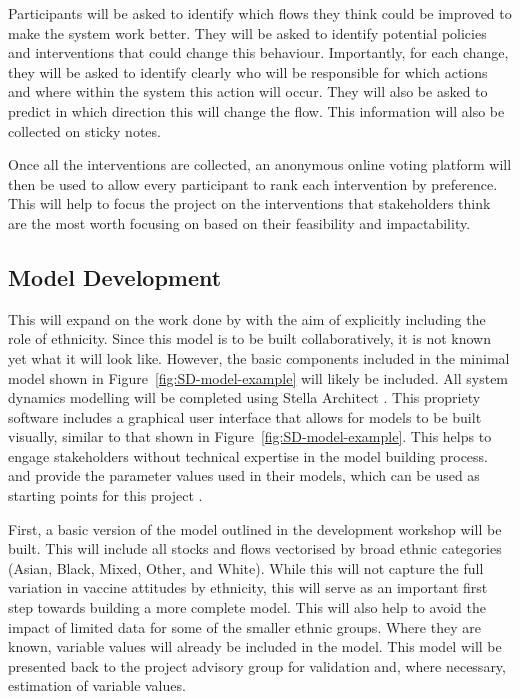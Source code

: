 \documentclass{article}
\begin{document}
Participants will be asked to identify which flows they think could be improved to make the system work better. They will be asked to identify potential policies and interventions that could change this behaviour. Importantly, for each change, they will be asked to identify clearly who will be responsible for which actions and where within the system this action will occur. They will also be asked to predict in which direction this will change the flow. This information will also be collected on sticky notes.

Once all the interventions are collected, an anonymous online voting platform will then be used to allow every participant to rank each intervention by preference. This will help to focus the project on the interventions that stakeholders think are the most worth focusing on based on their feasibility and impactability.

\subsection{Model Development}
This will expand on the work done by \citeauthor{van2020explaining} with the aim of explicitly including the role of ethnicity. Since this model is to be built collaboratively, it is not known yet what it will look like. However, the basic components included in the minimal model shown in Figure~\ref{fig:SD-model-example} will likely be included. All system dynamics modelling will be completed using Stella Architect \cite{StellaArchitect}. This propriety software includes a graphical user interface that allows for models to be built visually, similar to that shown in Figure~\ref{fig:SD-model-example}. This helps to engage stakeholders without technical expertise in the model building process. \citeauthor{van2020explaining} and \citeauthor{zadeh2025public} provide the parameter values used in their models, which can be used as starting points for this project \cite{van2020explaining, zadeh2025public}.

First, a basic version of the model outlined in the development workshop will be built. This will include all stocks and flows vectorised by broad ethnic categories (Asian, Black, Mixed, Other, and White). While this will not capture the full variation in vaccine attitudes by ethnicity, this will serve as an important first step towards building a more complete model. This will also help to avoid the impact of limited data for some of the smaller ethnic groups. Where they are known, variable values will already be included in the model. This model will be presented back to the project advisory group for validation and, where necessary, estimation of variable values.
\end{document}
